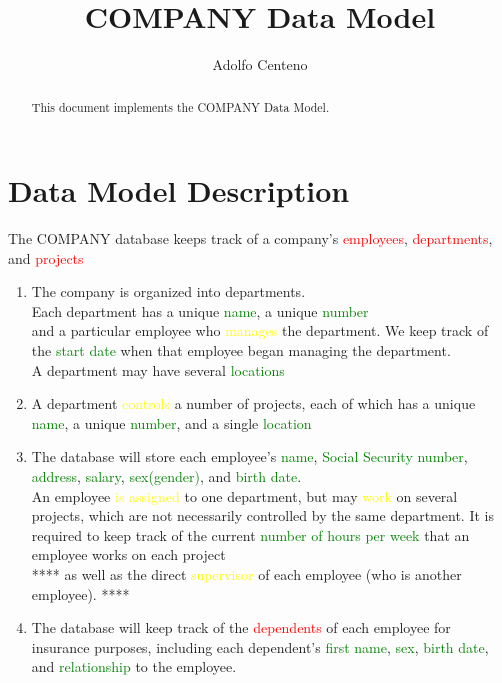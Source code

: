 \documentclass[10pt]{article}         %
\title{COMPANY Data Model}
\author{Adolfo Centeno}
\begin{document}
\maketitle

\begin{abstract}
This document implements the COMPANY Data Model.
\end{abstract}

\section{Data Model Description}

The COMPANY database keeps track of a company’s \textcolor{red}{employees}, \textcolor{red}{departments}, and \textcolor{red}{projects}



\begin{enumerate}

\item
  
The company is organized into departments. \\
Each department has a unique \textcolor{green}{name}, a unique \textcolor{green}{number}\\
and a particular employee who \textcolor{yellow}{manages} the department. 
We keep track of the \textcolor{green}{start date} when that employee began managing the department. \\
A department may have several \textcolor{green}{locations}


\item
A department \textcolor{yellow}{controls} a number of projects, each of which has a unique \textcolor{green}{name}, a unique \textcolor{green}{number}, and a single \textcolor{green}{location}

\item
The database will store each employee’s \textcolor{green}{name}, \textcolor{green}{Social Security number}, \textcolor{green}{address}, \textcolor{green}{salary}, \textcolor{green}{sex(gender)}, and \textcolor{green}{birth date}.\\ 
An employee \textcolor{yellow}{is assigned} to one department, but may \textcolor{yellow}{work} on several projects, which are not necessarily controlled by the same department. It is required to keep track of the current \textcolor{green}{number of hours per week} that an employee works on each project\\
**** as well as the direct \textcolor{yellow}{supervisor} of each employee (who is another employee). ****

\item
The database will keep track of the \textcolor{red}{dependents} of each employee for insurance purposes, including each dependent’s \textcolor{green}{first name}, \textcolor{green}{sex}, \textcolor{green}{birth date}, and \textcolor{green}{relationship} to the employee.

\end{enumerate}
\end{document}
